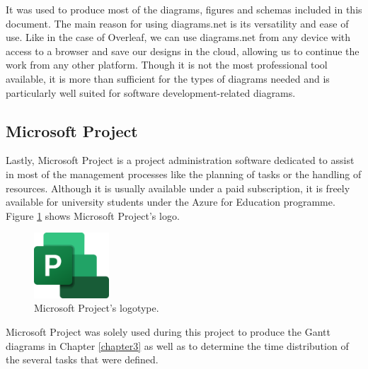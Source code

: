 It was used to produce most of the diagrams, figures and schemas included in this document. The main reason for using diagrams.net is its versatility and ease of use. Like in the case of Overleaf, we can use diagrams.net from any device with access to a browser and save our designs in the cloud, allowing us to continue the work from any other platform. Though it is not the most professional tool available, it is more than sufficient for the types of diagrams needed and is particularly well suited for software development-related diagrams.

\subsection{Microsoft Project}

Lastly, Microsoft Project \cite{noauthor_project_nodate} is a project administration software dedicated to assist in most of the management processes like the planning of tasks or the handling of resources. Although it is usually available under a paid subscription, it is freely available for university students under the Azure for Education programme. Figure \ref{fig:msproject} shows Microsoft Project's logo.

\begin{figure}[h]
  \centering
  \includegraphics[width=0.25\textwidth]{Figures/msproject.png}
  \caption{
    Microsoft Project's logotype.
  }
  \label{fig:msproject}
\end{figure}

Microsoft Project was solely used during this project to produce the Gantt diagrams in Chapter \ref{chapter3} as well as to determine the time distribution of the several tasks that were defined. 